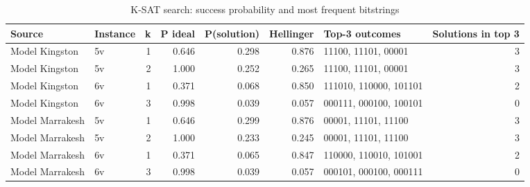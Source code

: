 \begin{table}[t]
\centering
\small
\caption{K-SAT search: success probability and most frequent bitstrings}
\label{tab:ksat}
\begin{tabular}{llrrrrlr}
\toprule
Source & Instance & k & P ideal & P(solution) & Hellinger & Top-3 outcomes & Solutions in top 3 \\
\midrule
Model Kingston & 5v & 1 & 0.646 & 0.298 & 0.876 & 11100, 11101, 00001 & 3 \\
Model Kingston & 5v & 2 & 1.000 & 0.252 & 0.265 & 11100, 11101, 00001 & 3 \\
Model Kingston & 6v & 1 & 0.371 & 0.068 & 0.850 & 111010, 110000, 101101 & 2 \\
Model Kingston & 6v & 3 & 0.998 & 0.039 & 0.057 & 000111, 000100, 100101 & 0 \\
Model Marrakesh & 5v & 1 & 0.646 & 0.299 & 0.876 & 00001, 11101, 11100 & 3 \\
Model Marrakesh & 5v & 2 & 1.000 & 0.233 & 0.245 & 00001, 11101, 11100 & 3 \\
Model Marrakesh & 6v & 1 & 0.371 & 0.065 & 0.847 & 110000, 110010, 101001 & 2 \\
Model Marrakesh & 6v & 3 & 0.998 & 0.039 & 0.057 & 000101, 000100, 000111 & 0 \\
\bottomrule
\end{tabular}
\end{table}
